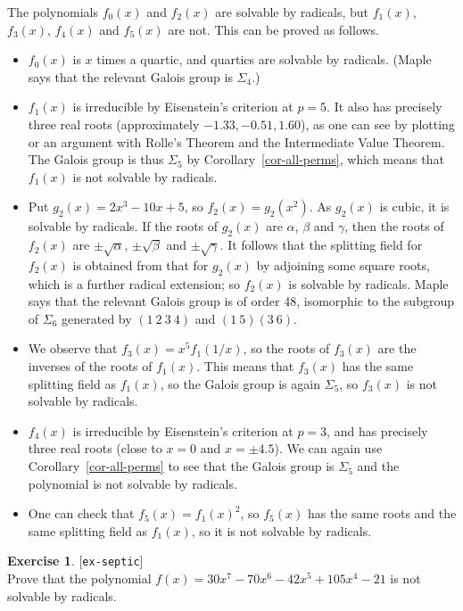 \documentclass{amsart}
\newcommand{\al}        {\alpha}
\newcommand{\bt}        {\beta}
\newcommand{\gm}        {\gamma}
\newcommand{\Sg}        {\Sigma}
\renewcommand{\:}{\colon}
\newcommand{\lastexlabel}{}
\newcommand{\exlabel}[1]{
 \global\def\lastexlabel{#1}\label{#1}[\texttt{#1}]\ \\
}
\newcommand{\exlabel}[1]{
 \global\def\lastexlabel{#1}\label{#1}
}
\newenvironment{solution}{\SolutionInline}{\endSolutionInline}
\theoremstyle{definition}
\newtheorem{exercise}{Exercise}[section]
\renewenvironment{solution}{\SolutionAtEnd}{\endSolutionAtEnd}
\begin{document}
\begin{solution}
 The polynomials $f_0(x)$ and $f_2(x)$ are solvable by radicals, but
 $f_1(x)$, $f_3(x)$, $f_4(x)$ and $f_5(x)$ are not.  This can be
 proved as follows.
 \begin{itemize}
  \item $f_0(x)$ is $x$ times a quartic, and quartics are solvable by
   radicals.  (Maple says that the relevant Galois group is $\Sg_4$.)
  \item $f_1(x)$ is irreducible by Eisenstein's criterion at $p=5$.
   It also has precisely three real roots (approximately $-1.33,
   -0.51, 1.60$), as one can see by plotting or an argument with
   Rolle's Theorem and the Intermediate Value Theorem.  The Galois
   group is thus $\Sg_5$ by Corollary~\ref{cor-all-perms}, which means
   that $f_1(x)$ is not solvable by radicals. 
  \item Put $g_2(x)=2x^3-10x+5$, so $f_2(x)=g_2(x^2)$.  As $g_2(x)$ is
   cubic, it is solvable by radicals.  If the roots of $g_2(x)$ are
   $\al$, $\bt$ and $\gm$, then the roots of $f_2(x)$ are
   $\pm\sqrt{\al}$, $\pm\sqrt{\bt}$ and $\pm\sqrt{\gm}$.  It follows
   that the splitting field for $f_2(x)$ is obtained from that for
   $g_2(x)$ by adjoining some square roots, which is a further radical
   extension; so $f_2(x)$ is solvable by radicals.  Maple says
   that the relevant Galois group is of order 48, isomorphic to the
   subgroup of $\Sg_6$ generated by $(1~2~3~4)$ and $(1~5)(3~6)$.
  \item We observe that $f_3(x)=x^5f_1(1/x)$, so the roots of $f_3(x)$
   are the inverses of the roots of $f_1(x)$.  This means that
   $f_3(x)$ has the same splitting field as $f_1(x)$, so the Galois
   group is again $\Sg_5$, so $f_3(x)$ is not solvable by radicals. 
  \item $f_4(x)$ is irreducible by Eisenstein's criterion at $p=3$,
   and has precisely three real roots (close to $x=0$ and
   $x=\pm 4.5$).  We can again use Corollary~\ref{cor-all-perms} to
   see that the Galois group is $\Sg_5$ and the polynomial is not
   solvable by radicals.
  \item One can check that $f_5(x)=f_1(x)^2$, so $f_5(x)$ has the same
   roots and the same splitting field as $f_1(x)$, so it is not
   solvable by radicals.
 \end{itemize}
\end{solution}
\begin{exercise}\exlabel{ex-septic}
 Prove that the polynomial $f(x)=30x^7-70x^6-42x^5+105x^4-21$ is not
 solvable by radicals.
\end{exercise}
\end{document}
